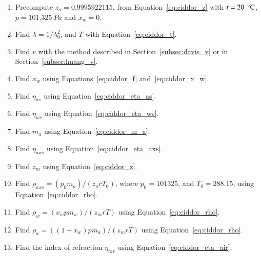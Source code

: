 \begin{enumerate}
\item Precompute $z_a = 0.9995922115$, from Equation~\ref{eq:ciddor_z} with $t = 20~\,^{\circ}{\rm C}$, $p = 101.325~Pa$ and $x_w=0$.
\item Find $\lambda = 1 / \lambda_0^2$, and $T$ with Equation~\ref{eq:ciddor_t}.
\item Find $v$ with the method described in Section~\ref{subsec:davis_v} or in Section~\ref{subsec:huang_v}.
\item Find $x_w$ using Equations~\ref{eq:ciddor_f} and~\ref{eq:ciddor_x_w}.
\item Find $\eta_{as}$ using Equation~\ref{eq:ciddor_eta_as}.
\item Find $\eta_{ws}$ using Equation~\ref{eq:ciddor_eta_ws}.
\item Find $m_a$ using Equation~\ref{eq:ciddor_m_a}.
\item Find $\eta_{axs}$ using Equation~\ref{eq:ciddor_eta_axs}.
\item Find $z_m$ using Equation~\ref{eq:ciddor_z}.
\item Find $\rho_{axs} = (p_0 m_a)/(z_a r T_0)$, where $p_0 = 101325$, and $T_0 = 288.15$, using Equation~\ref{eq:ciddor_rho}.
\item Find $\rho_{w} = (x_w p m_w)/(z_m r T)$ using Equation~\ref{eq:ciddor_rho}.
\item Find $\rho_{a} = ((1 - x_w) p m_a)/(z_m r T)$ using Equation~\ref{eq:ciddor_rho}.
\item Find the index of refraction $\eta_{air}$ using Equation~\ref{eq:ciddor_eta_air}.
\end{enumerate} 

